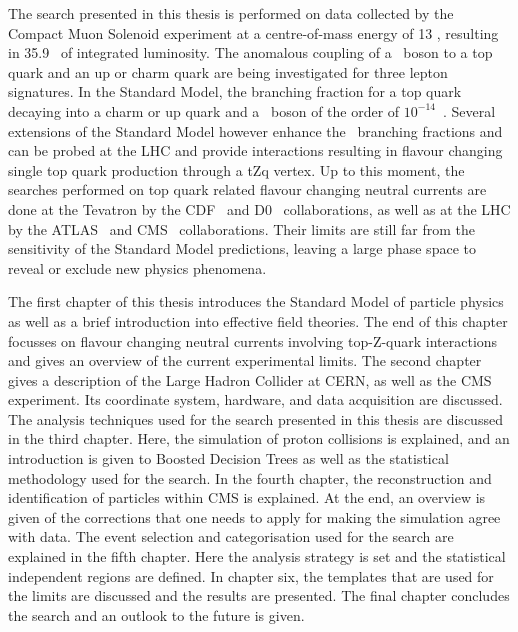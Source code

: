 The search presented in this thesis is performed on data collected by the Compact Muon Solenoid experiment at a centre-of-mass energy of 13 \TeV, resulting in 35.9 \fbinv\ of integrated luminosity. The anomalous coupling of a \PZ\ boson to a top quark and an up or charm quark are being investigated for three lepton signatures. In the Standard Model, the branching fraction for a top quark decaying into a charm or up quark and a \PZ\ boson of the order of $10^{-14}$~\cite{AguilarSaavedra:2004wm,PhysRevD.2.1285}. Several extensions of the Standard Model however enhance the \FCNC\ branching fractions and can be probed at the LHC \cite{AguilarSaavedra:2004wm} and provide interactions resulting in flavour changing single top quark production through a tZq vertex.  Up to this moment,  the searches performed on top quark related flavour changing neutral currents are done at the Tevatron by the CDF~\cite{PhysRevLett.101.192002} and D0~\cite{Abazov:2010qk} collaborations, as well as at the LHC by the ATLAS~\cite{Aad:2015uza,Aad:2015gea} and CMS~\cite{Sirunyan:2017kkr,Chatrchyan:2013nwa,Khachatryan:2015att,Sirunyan:2017kkr}  collaborations. Their limits are still far from the sensitivity of the Standard Model predictions,  leaving a large phase space to reveal or exclude new physics phenomena. 


The first chapter of this thesis introduces the Standard Model of particle physics as well as a brief introduction into effective field theories. The end of this chapter focusses on flavour changing neutral currents involving top-Z-quark interactions and gives an overview of the current experimental limits.  The second chapter gives a description of the Large Hadron Collider at CERN, as well as the CMS experiment. Its coordinate system, hardware, and data acquisition are discussed. The analysis techniques used for the search  presented in this thesis are discussed in the third chapter. Here, the simulation of proton collisions is explained, and an introduction is given to Boosted Decision Trees as well as the statistical methodology used for the search. In the fourth chapter, the reconstruction and identification of particles within CMS is explained. At the end, an overview is given of the corrections that one needs to apply for making the simulation agree with data. The event selection and categorisation used for the search are explained in the fifth chapter. Here the analysis strategy is set and the statistical independent regions are defined. In chapter six, the templates that are used for the limits are discussed and the results are presented. The final chapter concludes the search and an outlook to the future is given. 